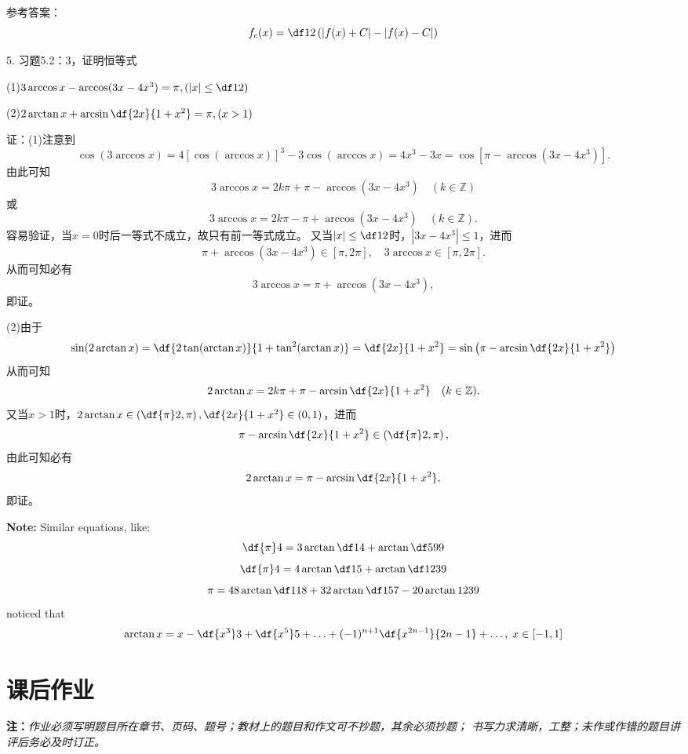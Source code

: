 参考答案：
$$f_c(x)=\df12\left(|f(x)+C|-|f(x)-C|\right)$$

\bigskip

5. 习题5.2：3，证明恒等式

(1)$3\arccos x-\arccos(3x-4x^3)=\pi,\left(|x|\leq\df12\right)$

(2)$2\arctan x+\arcsin\df{2x}{1+x^2}=\pi,(x>1)$

证：(1)注意到
$$\cos(3\arccos x)=4[\cos(\arccos x)]^3-3\cos(\arccos
x)=4x^3-3x=\cos[\pi-\arccos(3x-4x^3)].$$
由此可知
$$3\arccos x=2k\pi+\pi-\arccos(3x-4x^3)\quad(k\in\mathbb{Z})$$
或
$$3\arccos x=2k\pi-\pi+\arccos(3x-4x^3)\quad(k\in\mathbb{Z}).$$
容易验证，当$x=0$时后一等式不成立，故只有前一等式成立。
又当$|x|\leq\df12$时，$|3x-4x^3|\leq 1$，进而
$$\pi+\arccos(3x-4x^3)\in[\pi,2\pi],\quad 3\arccos x\in[\pi,2\pi].$$
从而可知必有
$$3\arccos x=\pi+\arccos(3x-4x^3),$$
即证。

(2)由于
$$\sin(2\arctan x)=\df{2\tan(\arctan x)}{1+\tan^2(\arctan
x)}=\df{2x}{1+x^2}=\sin\left(\pi-\arcsin\df{2x}{1+x^2}\right)$$
从而可知
$$2\arctan x=2k\pi+\pi-\arcsin\df{2x}{1+x^2}\quad(k\in\mathbb{Z}).$$
又当$x>1$时，$2\arctan x\in\left(\df{\pi}2,\pi\right),\df{2x}{1+x^2}\in(0,1)$，进而
$$\pi-\arcsin\df{2x}{1+x^2}\in\left(\df{\pi}2,\pi\right),$$
由此可知必有
$$2\arctan x=\pi-\arcsin\df{2x}{1+x^2},$$
即证。

{\bf Note:} Similar equations, like:
$$\df{\pi}4=3\arctan\df14+\arctan\df5{99}$$ 
$$\df{\pi}4=4\arctan\df15+\arctan\df1{239}$$
$$\pi=48\arctan\df1{18}+32\arctan\df1{57}-20\arctan1{239}$$  
noticed that
$$\arctan x=x-\df{x^3}3+\df{x^5}5+\ldots+(-1)^{n+1}\df{x^{2n-1}}{2n-1}
+\ldots,\;x\in[-1,1]$$

\newpage

\section*{课后作业}

{\bf 注：}{\it 作业必须写明题目所在章节、页码、题号；教材上的题目和作文可不抄题，其余必须抄题；
书写力求清晰，工整；未作或作错的题目讲评后务必及时订正。}

